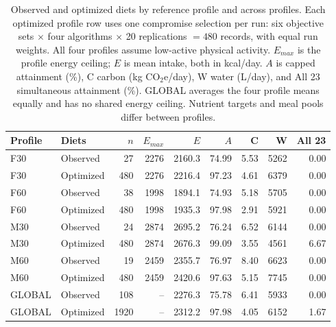 \begin{table}[pos=h]
\centering\small
\setlength{\tabcolsep}{3pt}
\caption{Observed and optimized diets by reference profile and across profiles. Each optimized profile row uses one compromise selection per run: six objective sets $\times$ four algorithms $\times$ 20 replications $=480$ records, with equal run weights. All four profiles assume low-active physical activity. $E_{max}$ is the profile energy ceiling; $E$ is mean intake, both in kcal/day. $A$ is capped attainment (\%), C carbon (kg CO$_2$e/day), W water (L/day), and All 23 simultaneous attainment (\%). GLOBAL averages the four profile means equally and has no shared energy ceiling. Nutrient targets and meal pools differ between profiles.}
\label{tab:observed-comparison}
\begin{tabularx}{\textwidth}{lXrrrrrrr}
\toprule
Profile & Diets & $n$ & $E_{max}$ & $E$ & $A$ & C & W & All 23 \\
\midrule
F30 & Observed & 27 & 2276 & 2160.3 & 74.99 & 5.53 & 5262 & 0.00 \\
F30 & Optimized & 480 & 2276 & 2216.4 & 97.23 & 4.61 & 6379 & 0.00 \\
\midrule
F60 & Observed & 38 & 1998 & 1894.1 & 74.93 & 5.18 & 5705 & 0.00 \\
F60 & Optimized & 480 & 1998 & 1935.3 & 97.98 & 2.91 & 5921 & 0.00 \\
\midrule
M30 & Observed & 24 & 2874 & 2695.2 & 76.24 & 6.52 & 6144 & 0.00 \\
M30 & Optimized & 480 & 2874 & 2676.3 & 99.09 & 3.55 & 4561 & 6.67 \\
\midrule
M60 & Observed & 19 & 2459 & 2355.7 & 76.97 & 8.40 & 6623 & 0.00 \\
M60 & Optimized & 480 & 2459 & 2420.6 & 97.63 & 5.15 & 7745 & 0.00 \\
\midrule
GLOBAL & Observed & 108 & -- & 2276.3 & 75.78 & 6.41 & 5933 & 0.00 \\
GLOBAL & Optimized & 1920 & -- & 2312.2 & 97.98 & 4.05 & 6152 & 1.67 \\
\bottomrule
\end{tabularx}
\end{table}
